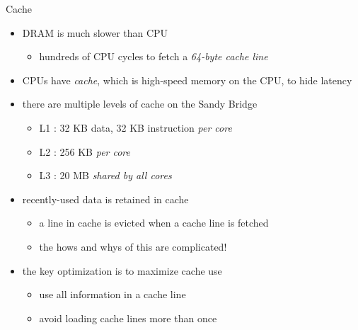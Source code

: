 

\begin{frame}[fragile]{}
    \begin{info}{Cache}
        \begin{itemize}
            \item DRAM is much slower than CPU
            \begin{itemize}
                \item hundreds of CPU cycles to fetch a \emph{64-byte cache line}
            \end{itemize}
        \item CPUs have \emph{cache}, which is high-speed memory on the CPU, to hide latency
            \item there are multiple levels of cache on the Sandy Bridge
            \begin{itemize}
                \item L1 : 32 KB data, 32 KB instruction \emph{per core}
                \item L2 : 256 KB \emph{per core}
                \item L3 : 20 MB \emph{shared by all cores}
            \end{itemize}
            \item recently-used data is retained in cache
            \begin{itemize}
                \item a line in cache is evicted when a cache line is fetched
                \item the hows and whys of this are complicated!
            \end{itemize}
            \item the key optimization is to maximize cache use
            \begin{itemize}
                \item use all information in a cache line
                \item avoid loading cache lines more than once
            \end{itemize}
        \end{itemize}
    \end{info}
\end{frame}

